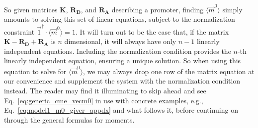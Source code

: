 So given matrices $\mathbf{K}$, $\mathbf{R_D}$, and $\mathbf{R_A}$ describing a
promoter, finding $\langle\vec{m}^0\rangle$ simply amounts to solving this set
of linear equations, subject to the normalization constraint $\vec{1}^\dagger
\cdot \langle\vec{m}^0\rangle = 1$. It will turn out to be the case that, if the
matrix $\mathbf{K} - \mathbf{R_D} + \mathbf{R_A}$ is $n$ dimensional, it will
always have only $n-1$ linearly independent equations. Including the
normalization condition provides the $n$-th linearly independent equation,
ensuring a unique solution. So when using this equation to solve for
$\langle\vec{m}^0\rangle$, we may always drop one row of the matrix equation at
our convenience and supplement the system with the normalization condition
instead.
The reader may find it illuminating to skip ahead and see
Eq.~\ref{eq:generic_cme_vecm0} in use with concrete examples, e.g.,
Eq.~\ref{eq:model1_m0_giver_appdx} and what follows it, before
continuing on through the general formulas for moments.

